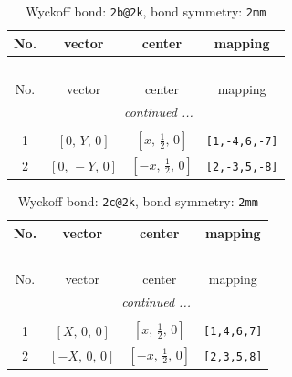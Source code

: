 \documentclass[fleqn,8pt]{jsarticle}
\begin{document}
\renewcommand{\arraystretch}{1.2}
\begin{longtable}{cccc}
\caption{Wyckoff bond: {\tt 2b@2k}, bond symmetry: {\tt 2mm}}
 \\
 \hline \hline
No. & vector & center & mapping \\ \hline \endfirsthead

\multicolumn{3}{l}{\tablename\ \thetable{}} \\
 \hline \hline
No. & vector & center & mapping \\ \hline \endhead

 \hline \hline
\multicolumn{3}{r}{\footnotesize\it continued ...} \\ \endfoot

 \hline \hline
\multicolumn{3}{r}{} \\ \endlastfoot

1 & $\left[ 0,\, Y,\, 0 \right]$ & $\left[ x,\, \frac{1}{2},\, 0 \right]$ & {\tt [1,-4,6,-7]} \\ \hline
2 & $\left[ 0,\, - Y,\, 0 \right]$ & $\left[ - x,\, \frac{1}{2},\, 0 \right]$ & {\tt [2,-3,5,-8]} \\
\end{longtable}
\renewcommand{\arraystretch}{1.2}
\begin{longtable}{cccc}
\caption{Wyckoff bond: {\tt 2c@2k}, bond symmetry: {\tt 2mm}}
 \\
 \hline \hline
No. & vector & center & mapping \\ \hline \endfirsthead

\multicolumn{3}{l}{\tablename\ \thetable{}} \\
 \hline \hline
No. & vector & center & mapping \\ \hline \endhead

 \hline \hline
\multicolumn{3}{r}{\footnotesize\it continued ...} \\ \endfoot

 \hline \hline
\multicolumn{3}{r}{} \\ \endlastfoot

1 & $\left[ X,\, 0,\, 0 \right]$ & $\left[ x,\, \frac{1}{2},\, 0 \right]$ & {\tt [1,4,6,7]} \\ \hline
2 & $\left[ - X,\, 0,\, 0 \right]$ & $\left[ - x,\, \frac{1}{2},\, 0 \right]$ & {\tt [2,3,5,8]} \\
\end{longtable}
\renewcommand{\arraystretch}{1.2}
\end{document}
